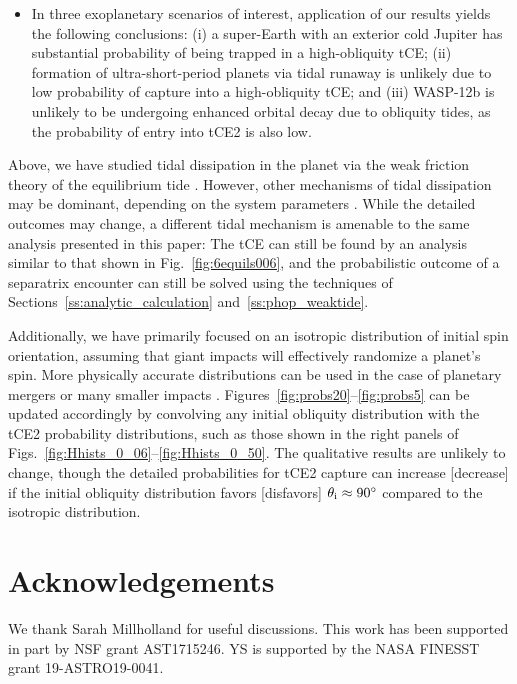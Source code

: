 \documentclass[
        fleqn,
        usenatbib,
        referee
    ]{mnras}
\begin{document}
\begin{itemize}
    \item In three exoplanetary scenarios of interest, application of our
        results yields the following conclusions: (i) a super-Earth with an
        exterior cold Jupiter has substantial probability of being trapped in a
        high-obliquity tCE\@; (ii) formation of ultra-short-period planets via
        tidal runaway is unlikely due to low probability of capture into a
        high-obliquity tCE\@; and (iii) WASP-12b is unlikely to be undergoing
        enhanced orbital decay due to obliquity tides, as the probability of
        entry into tCE2 is also low.
\end{itemize}

Above, we have studied tidal dissipation in the planet via the weak friction
theory of the equilibrium tide \citep{lai2012}. However, other mechanisms of
tidal dissipation may be dominant, depending on the system parameters
\citep[e.g.][]{papaloizou_ivanov_inertial, teyssandier2019formation}. While the
detailed outcomes may change, a different tidal mechanism is amenable to the
same analysis presented in this paper: The tCE can still be found by an analysis
similar to that shown in Fig.~\ref{fig:6equils006}, and the probabilistic
outcome of a separatrix encounter can still be solved using the techniques of
Sections~\ref{ss:analytic_calculation} and~\ref{ss:phop_weaktide}.

Additionally, we have primarily focused on an isotropic distribution of initial
spin orientation, assuming that giant impacts will effectively randomize a
planet's spin. More physically accurate distributions can be used in the case of
planetary mergers \citep{li2020planetary} or many smaller impacts
\citep{dones1993does}. Figures~\ref{fig:probs20}--\ref{fig:probs5} can be
updated accordingly by convolving any initial obliquity distribution with the
tCE2 probability distributions, such as those shown in the right panels of
Figs.~\ref{fig:Hhists_0_06}--\ref{fig:Hhists_0_50}. The qualitative results are
unlikely to change, though the detailed probabilities for tCE2 capture can
increase [decrease] if the initial obliquity distribution favors [disfavors]
$\theta_{\rm i} \approx 90^\circ$ compared to the isotropic distribution.

\section{Acknowledgements}

We thank Sarah Millholland for useful discussions. This work has been supported
in part by NSF grant AST1715246. YS is supported by the NASA FINESST grant
19-ASTRO19-0041.%
\end{document}
